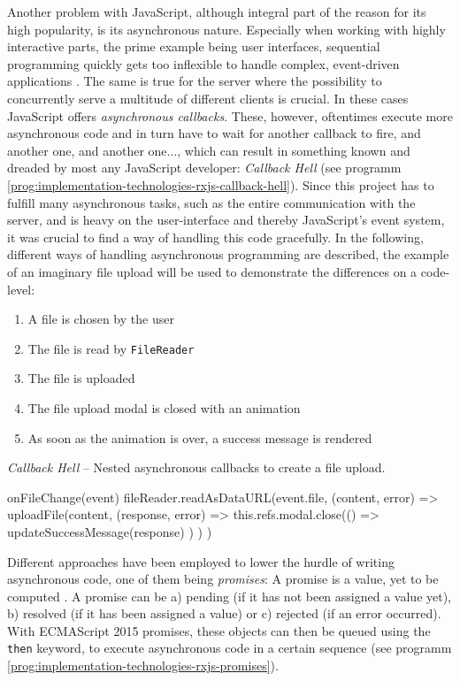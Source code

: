Another problem with JavaScript, although integral part of the reason for its high popularity, is its asynchronous nature. Especially when working with highly interactive parts, the prime example being user interfaces, sequential programming quickly gets too inflexible to handle complex, event-driven applications \cite{reactive-programming-survey}. The same is true for the server where the possibility to concurrently serve a multitude of different clients is crucial. In these cases JavaScript offers \emph{asynchronous callbacks}. These, however, oftentimes execute more asynchronous code and in turn have to wait for another callback to fire, and another one, and another one..., which can result in something known and dreaded by most any JavaScript developer: \emph{Callback Hell} (see programm \ref{prog:implementation-technologies-rxjs-callback-hell}). Since this project has to fulfill many asynchronous tasks, such as the entire communication with the server, and is heavy on the user-interface and thereby JavaScript's event system, it was crucial to find a way of handling this code gracefully. In the following, different ways of handling asynchronous programming are described, the example of an imaginary file upload will be used to demonstrate the differences on a code-level:
\begin{enumerate}
\item A file is chosen by the user
\item The file is read by \texttt{FileReader}
\item The file is uploaded
\item The file upload modal is closed with an animation
\item As soon as the animation is over, a success message is rendered
\end{enumerate}

\begin{program}
\caption{\emph{Callback Hell} -- Nested asynchronous callbacks to create a file upload.}
\label{prog:implementation-technologies-rxjs-callback-hell}
\begin{JsCode}
onFileChange(event) {
  fileReader.readAsDataURL(event.file, (content, error) => {
    uploadFile(content, (response, error) => {
      this.refs.modal.close(() => {
        updateSuccessMessage(response)
      })
    })
  })
}
\end{JsCode}
\end{program}

Different approaches have been employed to lower the hurdle of writing asynchronous code, one of them being \emph{promises}: A promise is a value, yet to be computed \cite{reactive-vs-promises}. A promise can be a) pending (if it has not been assigned a value yet), b) resolved (if it has been assigned a value) or c) rejected (if an error occurred). With ECMAScript 2015 promises, these objects can then be queued using the \texttt{then} keyword, to execute asynchronous code in a certain sequence (see programm \ref{prog:implementation-technologies-rxjs-promises}).

